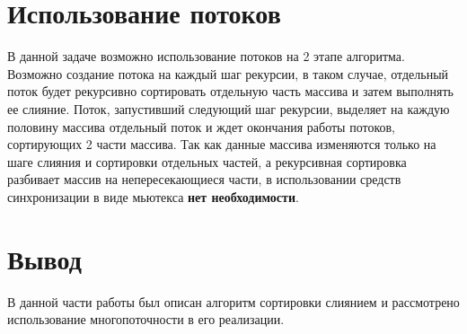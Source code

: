 \section{Использование потоков}
В данной задаче возможно использование потоков на 2 этапе алгоритма. Возможно создание  потока на каждый шаг рекурсии, в таком случае, 
отдельный поток будет рекурсивно сортировать отдельную часть массива  и затем выполнять ее слияние. 
Поток, запустивший следующий шаг рекурсии, выделяет на каждую половину массива отдельный поток и ждет окончания работы потоков, сортирующих 2 части массива. 
Так как данные массива изменяются только на шаге слияния и сортировки отдельных частей, а рекурсивная сортировка разбивает массив на непересекающиеся части, в использовании средств синхронизации в виде мьютекса \textbf{нет необходимости}.

\section*{Вывод}
В данной части работы был описан алгоритм сортировки слиянием и рассмотрено использование многопоточности в его реализации.






